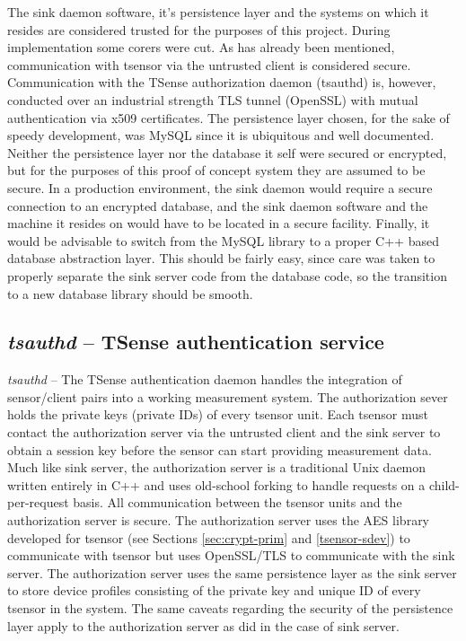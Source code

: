 The sink daemon software, it's persistence layer and the systems on which it resides are considered trusted for the purposes of this project. During implementation some corers were cut. As has already been mentioned, communication with tsensor via the untrusted client is considered secure. Communication with the TSense authorization daemon (tsauthd) is, however, conducted over an industrial strength TLS tunnel (OpenSSL) with mutual authentication via x509 certificates. The persistence layer chosen, for the sake of speedy development, was MySQL since it is ubiquitous and well documented. Neither the persistence layer nor the database it self were secured or encrypted, but for the purposes of this proof of concept system they are assumed to be secure. In a production environment, the sink daemon would require a secure connection to an encrypted database, and the sink daemon software and the machine it resides on would have to be located in a secure facility. Finally, it would be advisable to switch from the MySQL library to a proper C++ based database abstraction layer. This should be fairly easy, since care was taken to properly separate the sink server code from the database code, so the transition to a new database library should be smooth.

\subsection{\textit{tsauthd} -- TSense authentication service}
\label{sec:tsauthd-description}

\textit{tsauthd} -- The TSense authentication daemon handles the integration of sensor/client pairs into a working measurement system. The authorization sever holds the private keys (private IDs) of every tsensor unit. Each tsensor must contact the authorization server via the untrusted client and the sink server to obtain a session key before the sensor can start providing measurement data.  Much like sink server, the authorization server is a traditional Unix daemon written  entirely in C++ and uses old-school forking to handle requests on a child-per-request basis. All communication between the tsensor units and the authorization server is secure.  The authorization server uses the AES library developed for tsensor (see Sections \ref{sec:crypt-prim} and \ref{tsensor-sdev}) to communicate with tsensor but uses OpenSSL/TLS to communicate with the sink server. The authorization server uses the same persistence layer as the sink server to store device profiles consisting of the private key and unique ID of every tsensor in the system. The same caveats regarding the security of the persistence layer apply to the authorization server as did in the case of sink server.\\ 


